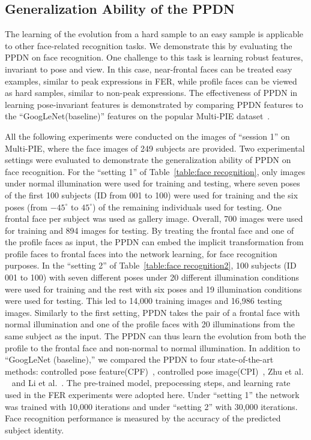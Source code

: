 \documentclass[runningheads]{llncs}
\begin{document}
\subsection{Generalization Ability of the PPDN}

The learning of the evolution from a hard sample to an 
easy sample is applicable to other face-related recognition 
tasks. We demonstrate this by evaluating the PPDN on face recognition. One 
challenge to this task is learning robust features,
invariant to pose and view. In this case,
near-frontal faces can be treated easy examples, similar to peak expressions 
in FER, while profile faces can be viewed as hard samples, similar to 
non-peak expressions. The effectiveness of PPDN in learning
pose-invariant features is demonstrated by comparing PPDN features
to the ``GoogLeNet(baseline)'' features on the popular Multi-PIE 
dataset~\cite{gross2010multi}. 

All the following experiments were conducted on the images of ``session 1''
on Multi-PIE, where the face images of 249 subjects are provided. Two 
experimental settings were evaluated to demonstrate the generalization 
ability of PPDN on face recognition. For the ``setting 1'' of 
Table~\ref{table:face recognition}, only images under normal illumination 
were used for training and testing, where  seven poses of the first 
100 subjects (ID from 001 to 100) were used for training and the
six poses (from $-45^{\circ}$ to  $45^{\circ}$) of the remaining individuals
used for testing. One frontal face per subject was used as gallery image. 
Overall, 700 images were used for training and 894 images for testing. 
By treating the frontal face and one of the profile faces as input, the 
PPDN can embed the implicit transformation from profile faces to frontal faces 
into the network learning, for face recognition purposes. In the
``setting 2'' of Table~\ref{table:face recognition2}, 100 subjects 
(ID 001 to 100) with seven different poses under 20 different illumination 
conditions were used for training and the rest with six poses and 
19 illumination conditions were used for testing. This led to 14,000 training
images and 16,986 testing images. Similarly to the first setting, PPDN takes 
the pair of a frontal face with normal illumination and one of the profile 
faces with 20 illuminations from the same subject as the input. 
The PPDN can thus learn the evolution from both the profile to the frontal 
face and non-normal to normal illumination. In addition to 
``GoogLeNet (baseline),'' we compared the PPDN to four state-of-the-art 
methods: controlled pose feature(CPF)~\cite{yim2015rotating}, controlled pose 
image(CPI)~\cite{yim2015rotating}, Zhu et al. ~\cite{zhu2013deep} and Li et 
al.~\cite{li2012coupled}. The pre-trained model, prepocessing steps, and 
learning rate used in the FER experiments were adopted here. Under 
``setting 1'' the network was trained with 10,000 iterations and under 
``setting 2'' with 30,000 iterations. Face recognition performance is 
measured by the accuracy of the predicted subject identity.
\end{document}
